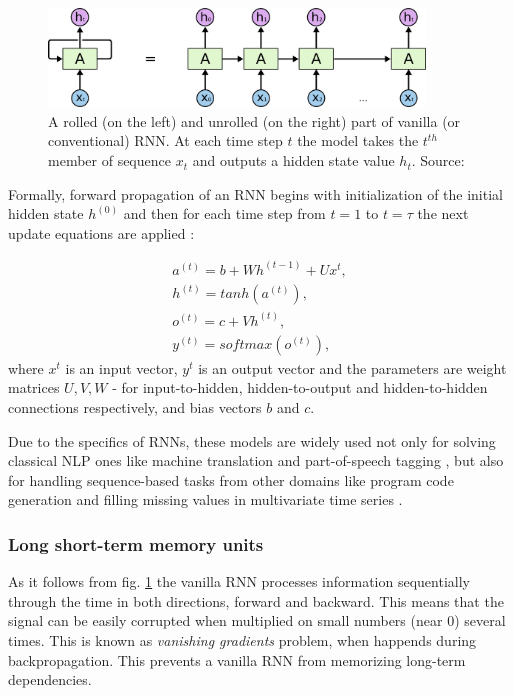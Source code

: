 \begin{figure}[h]
    \centering
    \includegraphics[width=10cm]{Images/RNN-unrolled.png}
    \caption{A rolled (on the left) and unrolled (on the right) part of vanilla (or conventional) RNN. At each time step $t$ the model takes the $t^{th}$ member of sequence $x_t$ and outputs a hidden state value $h_t$. Source: \citep{Olah-2015}}
    \label{fig:rnn}
\end{figure} 

Formally, forward propagation of an RNN begins with initialization of the initial hidden state $h^{(0)}$ and then for each time step from $t=1$ to $t=\tau$ the next update equations are applied \citep{Goodfellow-2016}:

\begin{equation}\label{eq:rnn}
\begin{gathered} 
    a^{(t)} = b+Wh^{(t-1)}+Ux^{t}, \\
    h^{(t)} = tanh(a^{(t)}), \\
    o^{(t)} = c+Vh^{(t)}, \\
    y^{(t)} = softmax(o^{(t)}),
\end{gathered}
\end{equation}
where $x^{t}$ is an input vector, $y^{t}$ is an output vector and the parameters are weight matrices $U, V, W$ - for input-to-hidden, hidden-to-output and hidden-to-hidden connections respectively, and bias vectors $b$ and $c$.

Due to the specifics of RNNs, these models are widely used not only for solving classical NLP ones like machine translation \citep{Chen-2018} and part-of-speech tagging \citep{Plank-2016}, but also for handling sequence-based tasks from other domains like program code generation \citep{Stehnii-2017} and filling missing values in multivariate time series \citep{Che-2016}.

\subsubsection{Long short-term memory units}
\label{sec:lstm}
As it follows from fig. \ref{fig:rnn} the vanilla RNN processes information sequentially through the time in both directions, forward and backward. This means that the signal can be easily corrupted when multiplied on small numbers (near 0) several times. This is known as \textit{vanishing gradients} problem, when happends during backpropagation. This prevents a vanilla RNN from memorizing long-term dependencies.

